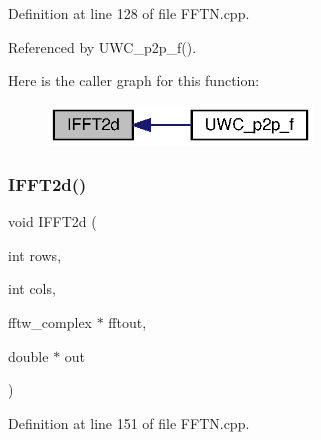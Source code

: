 Definition at line 128 of file F\+F\+T\+N.\+cpp.



Referenced by U\+W\+C\+\_\+p2p\+\_\+f().

Here is the caller graph for this function\+:\nopagebreak
\begin{figure}[H]
\begin{center}
\leavevmode
\includegraphics[width=199pt]{FFTN_8cpp_a4465313cbf2ef9d0c966c066c7e995be_a4465313cbf2ef9d0c966c066c7e995be_icgraph}
\end{center}
\end{figure}
\mbox{\label{FFTN_8cpp_ab9347430acea2369a310fac89d6399d7_ab9347430acea2369a310fac89d6399d7}} 
\subsubsection{I\+F\+F\+T2d()\hspace{0.1cm}{\footnotesize\ttfamily [2/2]}}
{\footnotesize\ttfamily void I\+F\+F\+T2d (\begin{DoxyParamCaption}\item[{int}]{rows,  }\item[{int}]{cols,  }\item[{fftw\+\_\+complex $\ast$}]{fftout,  }\item[{double $\ast$}]{out }\end{DoxyParamCaption})}



Definition at line 151 of file F\+F\+T\+N.\+cpp.

